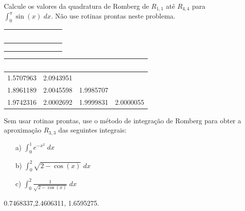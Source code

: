 \begin{exer}
 Calcule os valores da quadratura de Romberg de $R_{1,1}$ até $R_{4,4}$ para $\int_0^\pi \sin(x)\;dx$. Não use rotinas prontas neste problema.
\begin{center}
\begin{tabular}{|c|c|c|c|}
\hline
~\hspace{40pt}~ & ~\hspace{40pt}~& ~\hspace{40pt}~& ~\hspace{40pt}~\\
\hline
 & & &\\
\hline
&&&\\
\hline
&&&\\
\hline
\end{tabular}
\end{center}
\end{exer}
\begin{resp}
  
\begin{center}
\begin{tabular}{|c|c|c|c|}
\hline
~\hspace{40pt}~& ~\hspace{40pt}~& ~\hspace{40pt}~&\\
\hline
1.5707963  &  2.0943951 &&\\
\hline
1.8961189  &  2.0045598 &   1.9985707  &   \\
\hline
1.9742316  &  2.0002692 &   1.9999831 &   2.0000055  \\
\hline
\end{tabular}
\end{center}    
  
\end{resp}

\begin{exer}
Sem usar rotinas prontas, use o método de integração de Romberg para obter a aproximação $R_{3,3}$ das seguintes integrais:
\begin{itemize}
\item[a)] $\int_{0}^1 e^{-x^2}\;dx$
\item[b)] $\int_{0}^2 \sqrt{2-\cos(x)}\;dx$
\item[c)] $\int_{0}^2 \frac{1}{\sqrt{2-\cos(x)}}\;dx$
\end{itemize}
\end{exer}
\begin{resp}
  
0.7468337,2.4606311, 1.6595275.    
  
\end{resp}

